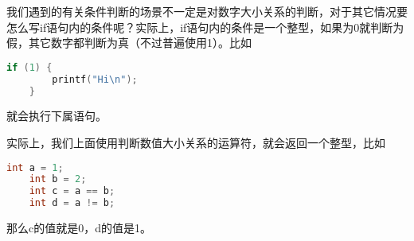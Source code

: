 我们遇到的有关条件判断的场景不一定是对数字大小关系的判断，对于其它情况要怎么写if语句内的条件呢？实际上，if语句内的条件是一个整型，如果为0就判断为假，其它数字都判断为真（不过普遍使用1）。比如

\begin{lstlisting}[language=C]
    if (1) {
        printf("Hi\n");
    }
\end{lstlisting}

就会执行下属语句。

实际上，我们上面使用判断数值大小关系的运算符，就会返回一个整型，比如

\begin{lstlisting}[language=C]
    int a = 1;
    int b = 2;
    int c = a == b;
    int d = a != b;
\end{lstlisting}

那么c的值就是0，d的值是1。
